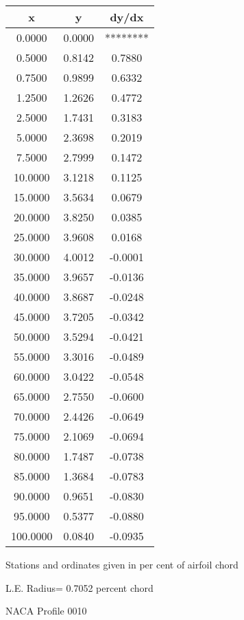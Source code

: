 \documentclass[11pt]{book}
\begin{document}
 \vspace{8mm}
 \begin{tabular}{|c|c|c|} \hline 
  x  &  y  &  dy/dx \\
 \hline
0.0000 & 0.0000 & ******** \\
0.5000 & 0.8142 & 0.7880 \\
0.7500 & 0.9899 & 0.6332 \\
1.2500 & 1.2626 & 0.4772 \\
2.5000 & 1.7431 & 0.3183 \\
5.0000 & 2.3698 & 0.2019 \\
7.5000 & 2.7999 & 0.1472 \\
10.0000 & 3.1218 & 0.1125 \\
15.0000 & 3.5634 & 0.0679 \\
20.0000 & 3.8250 & 0.0385 \\
25.0000 & 3.9608 & 0.0168 \\
30.0000 & 4.0012 & -0.0001 \\
35.0000 & 3.9657 & -0.0136 \\
40.0000 & 3.8687 & -0.0248 \\
45.0000 & 3.7205 & -0.0342 \\
50.0000 & 3.5294 & -0.0421 \\
55.0000 & 3.3016 & -0.0489 \\
60.0000 & 3.0422 & -0.0548 \\
65.0000 & 2.7550 & -0.0600 \\
70.0000 & 2.4426 & -0.0649 \\
75.0000 & 2.1069 & -0.0694 \\
80.0000 & 1.7487 & -0.0738 \\
85.0000 & 1.3684 & -0.0783 \\
90.0000 & 0.9651 & -0.0830 \\
95.0000 & 0.5377 & -0.0880 \\
100.0000 & 0.0840 & -0.0935 \\
 \hline
 \end{tabular}
 \vspace{8mm}


Stations and ordinates given in per cent of airfoil chord 


L.E. Radius=  0.7052 percent chord
 \newpage
  \label{p0010}
 \begin{Large}
 NACA Profile 0010
 \end{Large}
  
\end{document}
